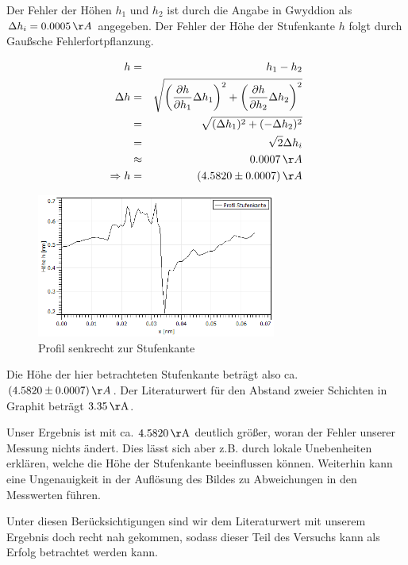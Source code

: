 \documentclass[12pt,a4paper]{scrartcl}
\numberwithin{equation}{section} %
\begin{document}
Der Fehler der Höhen $h_1$ und $h_2$ ist durch die Angabe in Gwyddion als $\Delta h_i = 0.0005 \,\AA$ angegeben. Der Fehler der Höhe der Stufenkante $h$ folgt durch Gaußsche Fehlerfortpflanzung.

\begin{eqnarray}
	h &=& h_1 - h_2 \\
	\Delta h &=& \sqrt{
			\left(\frac{\partial h}{\partial h_1} \Delta h_1\right)^2
			+ \left(\frac{\partial h}{\partial h_2} \Delta h_2\right)^2 } \\
			&=& \sqrt{(\Delta h_1)^2 + (-\Delta h_2)^2} \\
			&=& \sqrt{2} \Delta h_i \\
			&\approx& 0.0007 \,\AA \\
	\Rightarrow h &=& (4.5820 \pm 0.0007) \,\AA
\end{eqnarray}

\begin{figure}[h!]
	\centering
	\includegraphics[width=0.7\textwidth]{../media/B2.5/HOPG_Stufenkante_Profil.png}
	\caption{Profil senkrecht zur Stufenkante}
	\label{fig:stufenkante_profil}
\end{figure}

Die Höhe der hier betrachteten Stufenkante beträgt also ca. $(4.5820 \pm 0.0007) \,\AA$. Der Literaturwert für den Abstand zweier Schichten in Graphit beträgt $3.35 \mathrm{\, \normalfont{\AA}}$. \cite{Anleitung} %

Unser Ergebnis ist mit ca. $4.5820 \mathrm{\, \normalfont{\AA}}$ deutlich größer, woran der Fehler unserer Messung nichts ändert. Dies lässt sich aber z.B. durch lokale Unebenheiten erklären, welche die Höhe der Stufenkante beeinflussen können. Weiterhin kann eine Ungenauigkeit in der Auflösung des Bildes zu Abweichungen in den Messwerten führen.

Unter diesen Berücksichtigungen sind wir dem Literaturwert mit unserem Ergebnis doch recht nah gekommen, sodass dieser Teil des Versuchs kann als Erfolg betrachtet werden kann.
\end{document}
